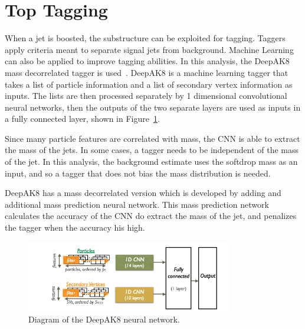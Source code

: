 \section{Top Tagging}
\label{sec:toptagging}

When a jet is boosted, the substructure can be exploited for tagging. Taggers apply criteria meant to separate signal jets from background. Machine Learning can also be applied to improve tagging abilities. In this analysis, the DeepAK8 mass decorrelated tagger is used~\cite{CMS:2020poo}. DeepAK8 is a machine learning tagger that takes a list of particle information and a list of secondary vertex information as inputs. The lists are then processed separately by 1 dimensional convolutional neural networks, then the outputs of the two separate layers are used as inputs in a fully connected layer, shown in Figure~\ref{fig:deepak8}.

Since many particle features are correlated with mass, the CNN is able to extract the mass of the jets. In some cases, a tagger needs to be independent of the mass of the jet. In this analysis, the background estimate uses the softdrop mass as an input, and so a tagger that does not bias the mass distribution is needed.

DeepAK8 has a mass decorrelated version which is developed by adding and additional mass prediction neural network. This mass prediction network calculates the accuracy of the CNN do extract the mass of the jet, and penalizes the tagger when the accuracy his high. 


\begin{figure}[h]
\centering
	\includegraphics[width=0.8\textwidth]{figures/deepak8.png}
	\caption{Diagram of the DeepAK8 neural network.}
	\label{fig:deepak8}
\end{figure}


